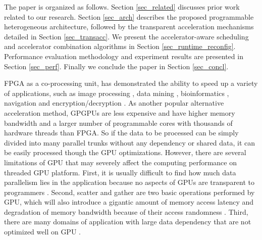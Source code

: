 The paper is organized as follows. Section \ref{sec_related} discusses
prior work related to our research. Section \ref{sec_arch} describes
the proposed programmable heterogeneous architecture, followed by the
transparent acceleration mechanisms detailed in Section
\ref{sec_transacc}. We present the accelerator-aware scheduling and
accelerator combination algorithms in Section
\ref{sec_runtime_reconfig}. Performance evaluation methodology and
experiment results are presented in Section \ref{sec_perf}. Finally we
conclude the paper in Section \ref{sec_concl}.

  FPGA as a
co-processing unit, has demonstrated the ability to speed up a variety
of applications, such as image processing \cite{imageacc}, data mining
\cite{data-mining-ref}, bioinformatics \cite{bioacc1} \cite{bioacc2},
navigation \cite{naviacc} and encryption/decryption
\cite{encryptionacc}. As another popular alternative acceleration
method, GPGPUs are less expensive and have higher memory bandwidth and
a larger number of programmable cores with thousands of hardware
threads than FPGA. So if the data to be processed can be simply
divided into many parallel trunks without any dependency or shared
data, it can be easily processed though the GPU
optimizations. However, there are several limitations of GPU that may
severely affect the computing performance on threaded GPU
platform. First, it is usually difficult to find how much data
parallelism lies in the application because no aspects of GPUs are
transparent to programmers \cite{microsoft06}. Second, scatter and
gather are two basic operations performed by GPU, which will also
introduce a gigantic amount of memory access latency and degradation
of memory bandwidth because of their access randomness
\cite{GPUlimit1}. Third, there are many domains of application with
large data dependency that are not optimized well on GPU
\cite{GPUlimit2}.  \fi
